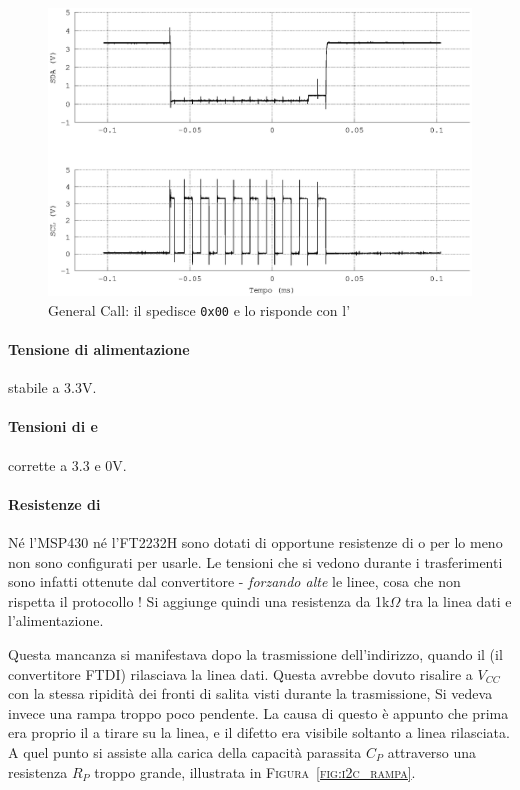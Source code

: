 \begin{figure}
\centering
  \includegraphics[width=.5\textwidth]{GeneralCallNero}
	\caption{General Call: il \master{} spedisce \texttt{0x00} e lo \slave{} risponde con l'\Ack{}}
    \label{fig:i2c_generalcall}
\end{figure}

\paragraph{Tensione di alimentazione}
	stabile a 3.3V.
    
\paragraph{Tensioni di {\sda} e {\scl}}
	corrette a 3.3 e 0V.

\paragraph{Resistenze di {\pullup}}
Né l'{MSP430} né l'{FT2232H}
sono dotati di opportune resistenze di {\pullup}
o per lo meno non sono configurati per usarle.
Le tensioni che si vedono durante i trasferimenti
sono infatti ottenute dal convertitore {\iic}-{\usb}
\emph{forzando alte} le linee,
cosa che non rispetta il protocollo {\iic}!
Si aggiunge quindi una resistenza da 1k$\Omega$
tra la linea dati e l'alimentazione.

Questa mancanza si manifestava dopo la trasmissione dell'indirizzo,
quando il \master{} (il convertitore {FTDI})
rilasciava la linea dati.
Questa avrebbe dovuto risalire a $V_{CC}$ con la stessa ripidità
dei fronti di salita visti durante la trasmissione,
Si vedeva invece una rampa troppo poco pendente.
La causa di questo è appunto che prima era proprio il \master{}
a tirare su la linea, e il difetto era visibile soltanto
a linea rilasciata. A quel punto si assiste
alla carica della capacità parassita $C_P$
attraverso una resistenza $R_P$ troppo grande,
illustrata in \textsc{Figura~\ref{fig:i2c_rampa}}.\\

